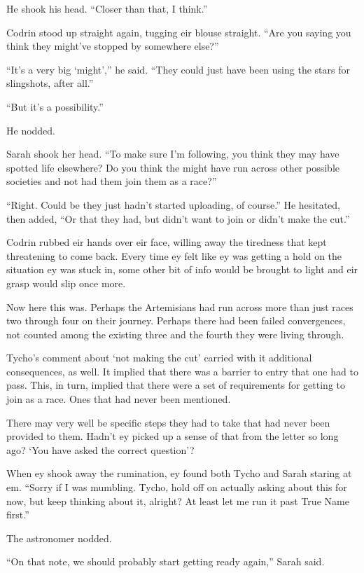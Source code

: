 He shook his head. ``Closer than that, I think.''

Codrin stood up straight again, tugging eir blouse straight. ``Are you saying you think they might've stopped by somewhere else?''

``It's a very big `might','' he said. ``They could just have been using the stars for slingshots, after all.''

``But it's a possibility.''

He nodded.

Sarah shook her head. ``To make sure I'm following, you think they may have spotted life elsewhere? Do you think the might have run across other possible societies and not had them join them as a race?''

``Right. Could be they just hadn't started uploading, of course.'' He hesitated, then added, ``Or that they had, but didn't want to join or didn't make the cut.''

Codrin rubbed eir hands over eir face, willing away the tiredness that kept threatening to come back. Every time ey felt like ey was getting a hold on the situation ey was stuck in, some other bit of info would be brought to light and eir grasp would slip once more.

Now here this was. Perhaps the Artemisians had run across more than just races two through four on their journey. Perhaps there had been failed convergences, not counted among the existing three and the fourth they were living through.

Tycho's comment about `not making the cut' carried with it additional consequences, as well. It implied that there was a barrier to entry that one had to pass. This, in turn, implied that there were a set of requirements for getting to join as a race. Ones that had never been mentioned.

There may very well be specific steps they had to take that had never been provided to them. Hadn't ey picked up a sense of that from the letter so long ago? `You have asked the correct question'?

When ey shook away the rumination, ey found both Tycho and Sarah staring at em. ``Sorry if I was mumbling. Tycho, hold off on actually asking about this for now, but keep thinking about it, alright? At least let me run it past True Name first.''

The astronomer nodded.

``On that note, we should probably start getting ready again,'' Sarah said.

